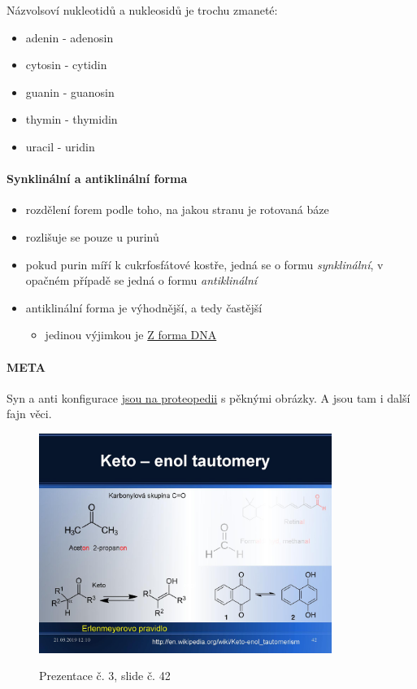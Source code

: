 \documentclass[DIV=8]{scrreprt}
\newcommand{\mybox}[2]{
    \paragraph{#1} #2
}
\begin{document}
Názvolsoví nukleotidů a nukleosidů je trochu zmaneté:
\begin{itemize}[nosep]
    \item adenin - adenosin
    \item cytosin - cytidin
    \item guanin - guanosin
    \item thymin - thymidin
    \item uracil - uridin
\end{itemize}



\paragraph{Synklinální a antiklinální forma}
\begin{itemize}[nosep]
    \item rozdělení forem podle toho, na jakou stranu je rotovaná báze
    \item rozlišuje se pouze u purinů
    \item pokud purin míří k cukrfosfátové kostře, jedná se o formu \emph{synklinální}, v opačném případě se jedná o formu \emph{antiklinální}
    \item antiklinální forma je výhodnější, a tedy častější
\begin{itemize}[nosep]
    \item jedinou výjimkou je \hyperref[Konformace Z]{Z forma DNA}
\end{itemize}

\end{itemize}



\mybox{META}{Syn a anti konfigurace \href{http://proteopedia.org/wiki/index.php/Syn_and_anti_nucleosides}{jsou na proteopedii} s pěknými obrázky. A jsou tam i další fajn věci.}


\begin{figure}
    \caption{Prezentace č. 3, slide č. 42}
    \includegraphics[width=0.85\textwidth]{slides-3/slide-42.jpg}
    \centering
    \label{slides-3-slide-42}
\end{figure}
\end{document}
